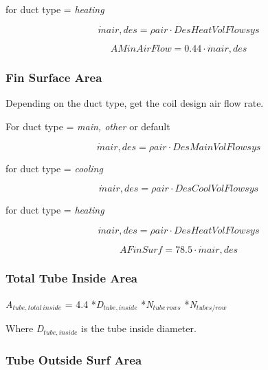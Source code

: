 for duct type = \emph{heating}

\begin{equation}
\dot mair,des = \rho air\cdot DesHeatVolFlowsys
\end{equation}

\begin{equation}
AMinAirFlow = 0.44\cdot \dot mair,des
\end{equation}

\subsubsection{Fin Surface Area}\label{fin-surface-area}

Depending on the duct type, get the coil design air flow rate.

For duct type = \emph{main, other} or default

\begin{equation}
\dot mair,des = \rho air\cdot DesMainVolFlowsys
\end{equation}

for duct type = \emph{cooling}

\begin{equation}
\dot mair,des = \rho air\cdot DesCoolVolFlowsys
\end{equation}

for duct type = \emph{heating}

\begin{equation}
\dot mair,des = \rho air\cdot DesHeatVolFlowsys
\end{equation}

\begin{equation}
AFinSurf = 78.5\cdot \dot mair,des
\end{equation}

\subsubsection{Total Tube Inside Area}\label{total-tube-inside-area}

\emph{A\(_{tube,total\, inside}\)} = 4.4 *\emph{D\(_{tube,inside}\)} *\emph{N\(_{tube\, rows}\)} *\emph{N\(_{tubes/row}\)}

Where \emph{D\(_{tube,inside}\)} is the tube inside diameter.

\subsubsection{Tube Outside Surf Area}\label{tube-outside-surf-area}


